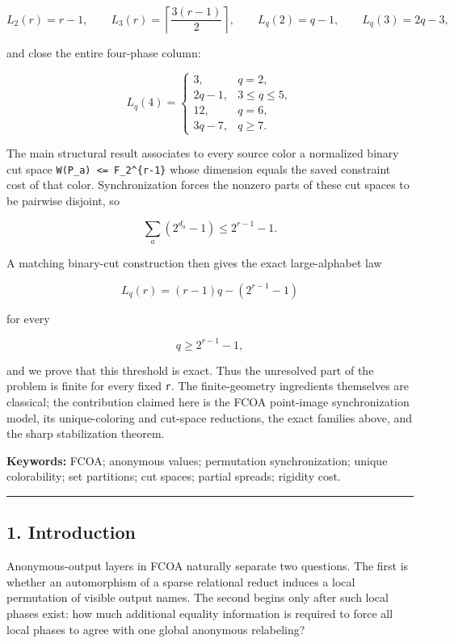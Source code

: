 \[
L_2(r)=r-1,
\qquad
L_3(r)=\left\lceil\frac{3(r-1)}2\right\rceil,
\qquad
L_q(2)=q-1,
\qquad
L_q(3)=2q-3,
\]

and close the entire four-phase column:

\[
L_q(4)=
\begin{cases}
3,&q=2,\\
2q-1,&3\le q\le5,\\
12,&q=6,\\
3q-7,&q\ge7.
\end{cases}
\]

The main structural result associates to every source color a normalized
binary cut space \texttt{W(P\_a)\ \textless{}=\ F\_2\^{}\{r-1\}} whose
dimension equals the saved constraint cost of that color.
Synchronization forces the nonzero parts of these cut spaces to be
pairwise disjoint, so

\[
\sum_a(2^{d_a}-1)\le2^{r-1}-1.
\]

A matching binary-cut construction then gives the exact large-alphabet
law

\[
\boxed{L_q(r)=(r-1)q-(2^{r-1}-1)}
\]

for every

\[
q\ge2^{r-1}-1,
\]

and we prove that this threshold is exact. Thus the unresolved part of
the problem is finite for every fixed \texttt{r}. The finite-geometry
ingredients themselves are classical; the contribution claimed here is
the FCOA point-image synchronization model, its unique-coloring and
cut-space reductions, the exact families above, and the sharp
stabilization theorem.

\textbf{Keywords:} FCOA; anonymous values; permutation synchronization;
unique colorability; set partitions; cut spaces; partial spreads;
rigidity cost.

\begin{center}\rule{0.5\linewidth}{0.5pt}\end{center}

\hypertarget{introduction}{%
\subsection{1. Introduction}\label{introduction}}

Anonymous-output layers in FCOA naturally separate two questions. The
first is whether an automorphism of a sparse relational reduct induces a
local permutation of visible output names. The second begins only after
such local phases exist: how much additional equality information is
required to force all local phases to agree with one global anonymous
relabeling?

